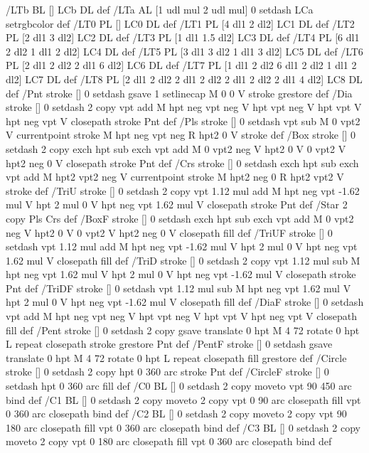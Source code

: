 /LTb {BL [] LCb DL} def
/LTa {AL [1 udl mul 2 udl mul] 0 setdash LCa setrgbcolor} def
/LT0 {PL [] LC0 DL} def
/LT1 {PL [4 dl1 2 dl2] LC1 DL} def
/LT2 {PL [2 dl1 3 dl2] LC2 DL} def
/LT3 {PL [1 dl1 1.5 dl2] LC3 DL} def
/LT4 {PL [6 dl1 2 dl2 1 dl1 2 dl2] LC4 DL} def
/LT5 {PL [3 dl1 3 dl2 1 dl1 3 dl2] LC5 DL} def
/LT6 {PL [2 dl1 2 dl2 2 dl1 6 dl2] LC6 DL} def
/LT7 {PL [1 dl1 2 dl2 6 dl1 2 dl2 1 dl1 2 dl2] LC7 DL} def
/LT8 {PL [2 dl1 2 dl2 2 dl1 2 dl2 2 dl1 2 dl2 2 dl1 4 dl2] LC8 DL} def
/Pnt {stroke [] 0 setdash gsave 1 setlinecap M 0 0 V stroke grestore} def
/Dia {stroke [] 0 setdash 2 copy vpt add M
  hpt neg vpt neg V hpt vpt neg V
  hpt vpt V hpt neg vpt V closepath stroke
  Pnt} def
/Pls {stroke [] 0 setdash vpt sub M 0 vpt2 V
  currentpoint stroke M
  hpt neg vpt neg R hpt2 0 V stroke
 } def
/Box {stroke [] 0 setdash 2 copy exch hpt sub exch vpt add M
  0 vpt2 neg V hpt2 0 V 0 vpt2 V
  hpt2 neg 0 V closepath stroke
  Pnt} def
/Crs {stroke [] 0 setdash exch hpt sub exch vpt add M
  hpt2 vpt2 neg V currentpoint stroke M
  hpt2 neg 0 R hpt2 vpt2 V stroke} def
/TriU {stroke [] 0 setdash 2 copy vpt 1.12 mul add M
  hpt neg vpt -1.62 mul V
  hpt 2 mul 0 V
  hpt neg vpt 1.62 mul V closepath stroke
  Pnt} def
/Star {2 copy Pls Crs} def
/BoxF {stroke [] 0 setdash exch hpt sub exch vpt add M
  0 vpt2 neg V hpt2 0 V 0 vpt2 V
  hpt2 neg 0 V closepath fill} def
/TriUF {stroke [] 0 setdash vpt 1.12 mul add M
  hpt neg vpt -1.62 mul V
  hpt 2 mul 0 V
  hpt neg vpt 1.62 mul V closepath fill} def
/TriD {stroke [] 0 setdash 2 copy vpt 1.12 mul sub M
  hpt neg vpt 1.62 mul V
  hpt 2 mul 0 V
  hpt neg vpt -1.62 mul V closepath stroke
  Pnt} def
/TriDF {stroke [] 0 setdash vpt 1.12 mul sub M
  hpt neg vpt 1.62 mul V
  hpt 2 mul 0 V
  hpt neg vpt -1.62 mul V closepath fill} def
/DiaF {stroke [] 0 setdash vpt add M
  hpt neg vpt neg V hpt vpt neg V
  hpt vpt V hpt neg vpt V closepath fill} def
/Pent {stroke [] 0 setdash 2 copy gsave
  translate 0 hpt M 4 {72 rotate 0 hpt L} repeat
  closepath stroke grestore Pnt} def
/PentF {stroke [] 0 setdash gsave
  translate 0 hpt M 4 {72 rotate 0 hpt L} repeat
  closepath fill grestore} def
/Circle {stroke [] 0 setdash 2 copy
  hpt 0 360 arc stroke Pnt} def
/CircleF {stroke [] 0 setdash hpt 0 360 arc fill} def
/C0 {BL [] 0 setdash 2 copy moveto vpt 90 450 arc} bind def
/C1 {BL [] 0 setdash 2 copy moveto
	2 copy vpt 0 90 arc closepath fill
	vpt 0 360 arc closepath} bind def
/C2 {BL [] 0 setdash 2 copy moveto
	2 copy vpt 90 180 arc closepath fill
	vpt 0 360 arc closepath} bind def
/C3 {BL [] 0 setdash 2 copy moveto
	2 copy vpt 0 180 arc closepath fill
	vpt 0 360 arc closepath} bind def
